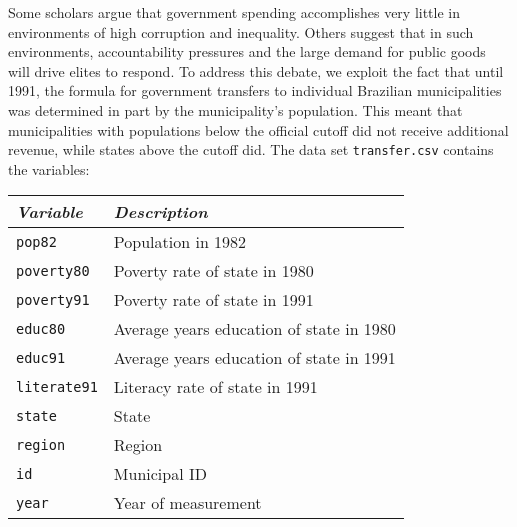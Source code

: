 \documentclass[11pt]{article}
\begin{document}
Some
scholars argue that government spending accomplishes very little in
environments of high corruption and inequality. Others suggest that in
such environments, accountability pressures and the large demand for
public goods will drive elites to respond.  To address this debate, we
exploit the fact that until 1991, the formula for government transfers
to individual Brazilian municipalities was determined in part by the
municipality's population. This meant that municipalities with
populations below the official cutoff did not receive additional
revenue, while states above the cutoff did.  The data set
{\tt transfer.csv} contains the variables:


\vspace{1mm}
\begin{center}
\begin{tabular}{l p{7 cm}}
 \hline
\textit{Variable} & \textit{Description} \\
\hline
{\tt pop82}     &        Population in 1982 \\
{\tt poverty80} &         Poverty rate of state in 1980 \\
{\tt poverty91} &         Poverty rate of state in 1991 \\
{\tt educ80} &            Average years education of state in 1980 \\
{\tt educ91} &            Average years education of state in 1991 \\
{\tt literate91} &        Literacy rate of state in 1991 \\ 
{\tt state} &             State \\
{\tt region} &            Region \\
{\tt id} &                Municipal ID \\
{\tt year} &              Year of measurement \\
 \hline
\end{tabular}
\end{center} 
\end{document}
